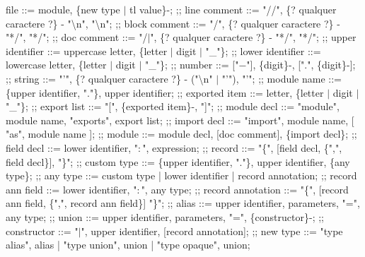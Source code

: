 \begin{bnfgrammar}
    file ::= module, \{new type $\vert$ tl value\}-;
    ;;
    line comment ::= "\slash\slash", \{? qualquer caractere ?\} - "\textbackslash n", "\textbackslash n";
    ;;
    block comment ::= "\slash*", \{? qualquer caractere ?\} - "*\slash", "*\slash";
    ;;
    doc comment ::= "\slash*$\vert$", \{? qualquer caractere ?\} - "*\slash", "*\slash";
    ;;
    upper identifier ::= uppercase letter, \{letter $\vert$ digit $\vert$ "\_"\};
    ;;
    lower identifier ::= lowercase letter, \{letter $\vert$ digit $\vert$ "\_"\};
    ;;
    number ::= ["$-$"], \{digit\}-, [".", \{digit\}-];
    ;;
    string ::= "'", \{? qualquer caractere ?\} - ("\textbackslash n" $\vert$ "'"), "'";
    ;;
    module name ::= \{upper identifier, "."\}, upper identifier;
    ;;
    exported item ::= letter, \{letter $\vert$ digit $\vert$ "\_"\};
    ;;
    export list ::= "[", \{exported item\}-, "]";
    ;;
    module decl ::= "module", module name, "exports", export list;
    ;;
    import decl ::= "import", module name, [ "as", module name ];
    ;;
    module ::= module decl, [doc comment], \{import decl\};
    ;;
    field decl ::= lower identifier, "$\colon$", expression;
    ;;
    record ::= "\{", [field decl, \{",", field decl\}], "\}";
    ;;
    custom type ::= \{upper identifier, "."\}, upper identifier, \{any type\};
    ;;
    any type ::= custom type
    | lower identifier
    | record annotation;
    ;;
    record ann field ::= lower identifier, "$\colon$", any type;
    ;;
    record annotation ::= "\{", [record ann field, \{",", record ann field\}] "\}";
    ;;
    alias ::= upper identifier, parameters, "=", any type;
    ;;
    union ::= upper identifier, parameters, "=", \{constructor\}-;
    ;;
    constructor ::= "$\vert$", upper identifier, [record annotation];
    ;;
    new type ::= "type alias", alias
    | "type union", union
    | "type opaque", union;
\end{bnfgrammar}
